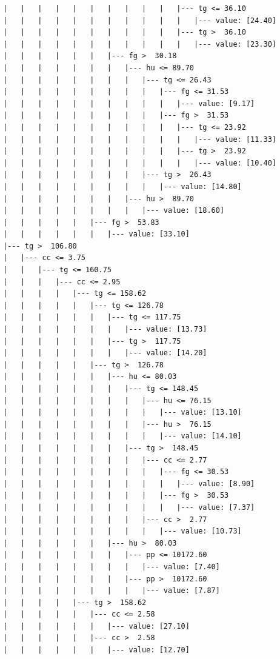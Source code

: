 \documentclass[UTF8, a4paper]{ctexart}
\begin{document}
\begin{lstlisting}
|   |   |   |   |   |   |   |   |   |   |--- tg <= 36.10
|   |   |   |   |   |   |   |   |   |   |   |--- value: [24.40]
|   |   |   |   |   |   |   |   |   |   |--- tg >  36.10
|   |   |   |   |   |   |   |   |   |   |   |--- value: [23.30]
|   |   |   |   |   |   |--- fg >  30.18
|   |   |   |   |   |   |   |--- hu <= 89.70
|   |   |   |   |   |   |   |   |--- tg <= 26.43
|   |   |   |   |   |   |   |   |   |--- fg <= 31.53
|   |   |   |   |   |   |   |   |   |   |--- value: [9.17]
|   |   |   |   |   |   |   |   |   |--- fg >  31.53
|   |   |   |   |   |   |   |   |   |   |--- tg <= 23.92
|   |   |   |   |   |   |   |   |   |   |   |--- value: [11.33]
|   |   |   |   |   |   |   |   |   |   |--- tg >  23.92
|   |   |   |   |   |   |   |   |   |   |   |--- value: [10.40]
|   |   |   |   |   |   |   |   |--- tg >  26.43
|   |   |   |   |   |   |   |   |   |--- value: [14.80]
|   |   |   |   |   |   |   |--- hu >  89.70
|   |   |   |   |   |   |   |   |--- value: [18.60]
|   |   |   |   |   |--- fg >  53.83
|   |   |   |   |   |   |--- value: [33.10]
|--- tg >  106.80
|   |--- cc <= 3.75
|   |   |--- tg <= 160.75
|   |   |   |--- cc <= 2.95
|   |   |   |   |--- tg <= 158.62
|   |   |   |   |   |--- tg <= 126.78
|   |   |   |   |   |   |--- tg <= 117.75
|   |   |   |   |   |   |   |--- value: [13.73]
|   |   |   |   |   |   |--- tg >  117.75
|   |   |   |   |   |   |   |--- value: [14.20]
|   |   |   |   |   |--- tg >  126.78
|   |   |   |   |   |   |--- hu <= 80.03
|   |   |   |   |   |   |   |--- tg <= 148.45
|   |   |   |   |   |   |   |   |--- hu <= 76.15
|   |   |   |   |   |   |   |   |   |--- value: [13.10]
|   |   |   |   |   |   |   |   |--- hu >  76.15
|   |   |   |   |   |   |   |   |   |--- value: [14.10]
|   |   |   |   |   |   |   |--- tg >  148.45
|   |   |   |   |   |   |   |   |--- cc <= 2.77
|   |   |   |   |   |   |   |   |   |--- fg <= 30.53
|   |   |   |   |   |   |   |   |   |   |--- value: [8.90]
|   |   |   |   |   |   |   |   |   |--- fg >  30.53
|   |   |   |   |   |   |   |   |   |   |--- value: [7.37]
|   |   |   |   |   |   |   |   |--- cc >  2.77
|   |   |   |   |   |   |   |   |   |--- value: [10.73]
|   |   |   |   |   |   |--- hu >  80.03
|   |   |   |   |   |   |   |--- pp <= 10172.60
|   |   |   |   |   |   |   |   |--- value: [7.40]
|   |   |   |   |   |   |   |--- pp >  10172.60
|   |   |   |   |   |   |   |   |--- value: [7.87]
|   |   |   |   |--- tg >  158.62
|   |   |   |   |   |--- cc <= 2.58
|   |   |   |   |   |   |--- value: [27.10]
|   |   |   |   |   |--- cc >  2.58
|   |   |   |   |   |   |--- value: [12.70]

\end{lstlisting}
\end{document}
